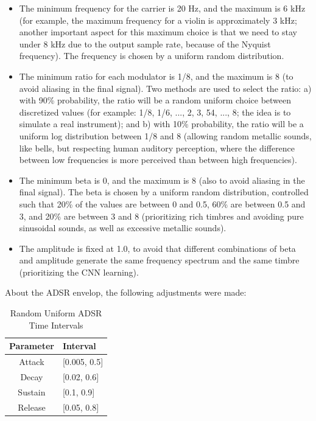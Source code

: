 \documentclass[sigconf,natbib=false]{acmart}
\begin{document}
\begin{itemize}
\item The minimum frequency for the carrier is 20 Hz, and the maximum is 6 kHz (for example, the maximum frequency for a violin is approximately 3 kHz; another important aspect for this maximum choice is that we need to stay under 8 kHz due to the output sample rate, because of the Nyquist frequency). The frequency is chosen by a uniform random distribution.
\item The minimum ratio for each modulator is 1/8, and the maximum is 8 (to avoid aliasing in the final signal). Two methods are used to select the ratio: a) with 90\% probability, the ratio will be a random uniform choice between discretized values (for example: 1/8, 1/6, ..., 2, 3, 54, ..., 8; the idea is to simulate a real instrument); and b) with 10\% probability, the ratio will be a uniform log distribution between 1/8 and 8 (allowing random metallic sounds, like bells, but respecting human auditory perception, where the difference between low frequencies is more perceived than between high frequencies).
\item The minimum beta is 0, and the maximum is 8 (also to avoid aliasing in the final signal). The beta is chosen by a uniform random distribution, controlled such that 20\% of the values are between 0 and 0.5, 60\% are between 0.5 and 3, and 20\% are between 3 and 8 (prioritizing rich timbres and avoiding pure sinusoidal sounds, as well as excessive metallic sounds).
\item The amplitude is fixed at 1.0, to avoid that different combinations of beta and amplitude generate the same frequency spectrum and the same timbre (prioritizing the CNN learning).
\end{itemize}

About the ADSR envelop, the following adjustments were made:

\begin{table}
  \caption{Random Uniform ADSR Time Intervals}
  \label{tab:time_intervals}
  \begin{tabular}{cl}
    \toprule
    Parameter & Interval \\
    \midrule
    Attack  & [0.005, 0.5] \\
    Decay   & [0.02, 0.6] \\
    Sustain & [0.1, 0.9] \\
    Release & [0.05, 0.8] \\
    \bottomrule
  \end{tabular}
\end{table}
\end{document}
